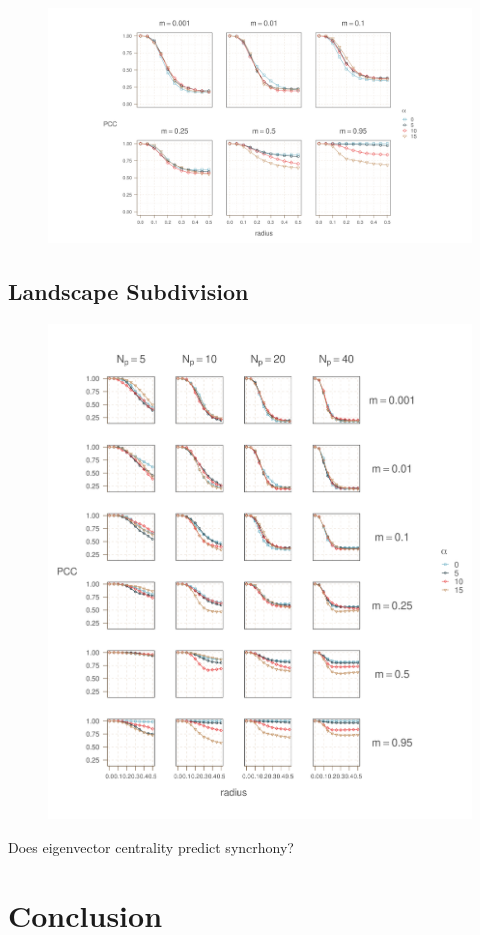 \documentclass[]{article}
\begin{document}
\begin{figure}
    \includegraphics[width=15cm]{figs/figure9}
    \caption{}
    \label{}
\end{figure}

\hypertarget{simulating-a-phase-transition-across-a-migration-gradient}{%
\subsection{Landscape Subdivision}\label{simulating-a-phase-transition-across-a-migration-gradient}}

\begin{figure}
    \includegraphics[width=15cm]{figs/figure10}
    \caption{}
    \label{}
\end{figure}

Does eigenvector centrality predict syncrhony? 


\hypertarget{conclusion}{%
\section{Conclusion}\label{conclusion}}

\clearpage
{
\footnotesize

}
\end{document}
